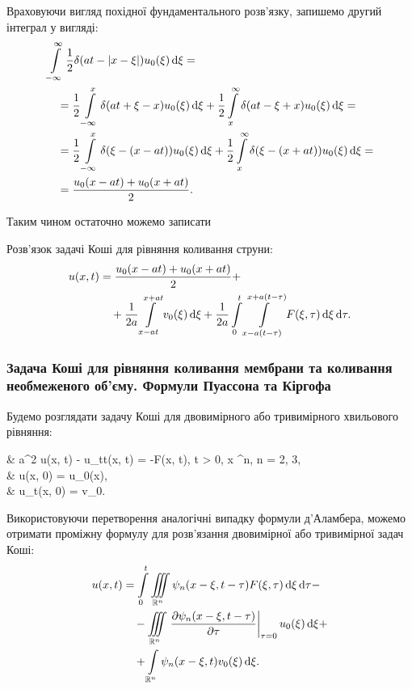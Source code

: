 Враховуючи вигляд похідної фундаментального розв'язку, запишемо другий інтеграл у вигляді: 
\begin{equation}
	\begin{aligned}
		& \displaystyle\int\limits_{-\infty}^\infty \frac{1}{2} \delta(at - |x - \xi|) u_0(\xi) \mathop{}\!\mathrm{d} \xi = \\
		& \quad = \frac{1}{2} \displaystyle\int\limits_{-\infty}^x \delta(at + \xi - x) u_0(\xi) \mathop{}\!\mathrm{d} \xi + \frac{1}{2} \displaystyle\int\limits_x^\infty \delta(at - \xi + x) u_0(\xi) \mathop{}\!\mathrm{d} \xi = \\
		& \quad = \frac{1}{2} \displaystyle\int\limits_{-\infty}^x \delta(\xi - (x - at)) u_0(\xi) \mathop{}\!\mathrm{d} \xi + \frac{1}{2} \displaystyle\int\limits_x^\infty \delta(\xi - (x + at)) u_0(\xi) \mathop{}\!\mathrm{d} \xi = \\
		& \quad = \frac{u_0(x - at) + u_0(x + at)}{2}.
	\end{aligned}
\end{equation}

Таким чином остаточно можемо записати 
\begin{th_formula}[д'Аламбера]
	Розв'язок задачі Коші для рівняння коливання струни:
	\begin{equation}
		\begin{aligned}
			u(x, t) &= \frac{u_0(x - at) + u_0(x + at)}{2} + \\
			& \quad + \frac{1}{2a} \displaystyle\int\limits_{x - at}^{x + at} v_0(\xi) \mathop{}\!\mathrm{d} \xi + \frac{1}{2a} \displaystyle\int\limits_0^t \displaystyle\int\limits_{x - a(t - \tau)}^{x + a(t - \tau)} F(\xi, \tau) \mathop{}\!\mathrm{d} \xi \mathop{}\!\mathrm{d} \tau.
		\end{aligned}
	\end{equation}
\end{th_formula}

\subsubsection{Задача Коші для рівняння коливання мембрани та коливання необмеженого об'єму. Формули Пуассона та Кіргофа}

\begin{example}
	Будемо розглядати задачу Коші для двовимірного або тривимірного хвильового рівняння:
	\begin{system}
		& a^2 \Delta u(x, t) - u_{tt}(x, t) = -F(x, t), \quad t > 0, \quad x \in \RR^n, \quad n = 2, 3, \\
		& u(x, 0) = u_0(x), \\
		& u_t(x, 0) = v_0.
	\end{system}
\end{example}

Використовуючи перетворення аналогічні випадку формули д'Аламбера, можемо отримати проміжну формулу для розв'язання двовимірної або тривимірної задач Коші:
\begin{equation}
	\begin{aligned}
		u(x, t) &= \displaystyle\int\limits_0^t \displaystyle\iiint\limits_{\mathbb{R}^n} \psi_n(x - \xi, t - \tau) F(\xi, \tau) \mathop{}\!\mathrm{d} \xi \mathop{}\!\mathrm{d} \tau - \\
		& \quad -\displaystyle\iiint\limits_{\mathbb{R}^n} \left. \frac{\partial \psi_n(x - \xi, t - \tau)}{\partial \tau} \right|_{\tau = 0} u_0(\xi) \mathop{}\!\mathrm{d} \xi + \\
		& \quad + \displaystyle\int\limits_{\mathbb{R}^n} \psi_n(x - \xi, t) v_0(\xi) \mathop{}\!\mathrm{d} \xi.
	\end{aligned}
\end{equation}

